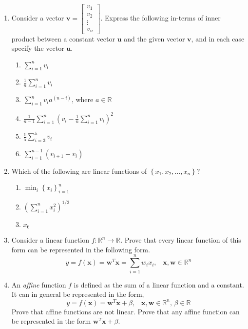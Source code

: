 \begin{enumerate}
    \item Consider a vector $\mathbf{v} = \begin{bmatrix*}v_1\\v_2\\\vdots\\v_n\end{bmatrix*}$. Express the following in-terms of inner product between a constant vector $\mathbf{u}$ and the given vector $\mathbf{v}$, and in each case specify the vector $\mathbf{u}$.
    \begin{enumerate}
        \item $\sum_{i=1}^nv_i$
        \item $\frac{1}{n}\sum_{i=1}^nv_i$
        \item $\sum_{i=1}^nv_ia^{\left(n - i\right)}$, where $a \in \mathbb{R}$
        \item $\frac{1}{n-1}\sum_{i=1}^n\left(v_i - \frac{1}{n}\sum_{i=1}^nv_i \right)^2$
        \item $\frac{1}{5}\sum_{i=3}^5 v_i$
        \item $\sum_{i=1}^{n-1} \left(v_{i+1} - v_i\right)$
    \end{enumerate}
    
    \item Which of the following are linear functions of $\left\{x_1, x_2, \ldots,x_n\right\}$?
    \begin{enumerate}
        \item $\min_i \left\{x_i\right\}_{i=1}^{n}$
        \item $\left(\sum_{i=1}^n x_i^2\right)^{1/2}$
        \item $x_6$
    \end{enumerate}
    
    \item Consider a linear function $f: \mathbb{R}^n \rightarrow \mathbb{R}$. Prove that every linear function of this form can be represented in the following form.
    \[ y = f\left(\mathbf{x}\right) = \mathbf{w}^T\mathbf{x} = \sum_{i=1}^{n}w_ix_i, \,\,\,\,\, \mathbf{x}, \mathbf{w} \in \mathbb{R}^n \]

    \item An \textit{affine} function $f$ is defined as the sum of a linear function and a constant. It can in general be represented in the form, 
    \[ y = f\left(\mathbf{x}\right) = \mathbf{w}^T\mathbf{x} + \beta, \,\,\,\,\, \mathbf{x}, \mathbf{w} \in \mathbb{R}^n, \, \beta \in \mathbb{R} \]
    Prove that affine functions are not linear. Prove that any affine function can be represented in the form $\mathbf{w}^T\mathbf{x} + \beta$.


\end{enumerate}
